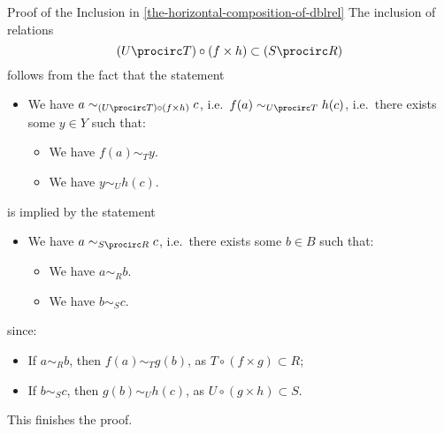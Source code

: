 \begin{Proof}{Proof of the Inclusion in \cref{the-horizontal-composition-of-dblrel}}%
    The inclusion of relations
    \[
        (U\procirc T)\circ(f\times h)%
        \subset%
        (S\procirc R)%
    \]%
    follows from the fact that the statement
    \begin{itemize}
        \item We have $a\sim_{(U\procirc T)\circ(f\times h)}c$, i.e.\ $f(a)\sim_{U\procirc T}h(c)$, i.e.\ there exists some $y\in Y$ such that:
            \begin{itemize}
                \item We have $f(a)\sim_{T}y$.
                \item We have $y\sim_{U}h(c)$.
            \end{itemize}
    \end{itemize}
    is implied by the statement
    \begin{itemize}
        \item We have $a\sim_{S\procirc R}c$, i.e.\ there exists some $b\in B$ such that:
            \begin{itemize}
                \item We have $a\sim_{R}b$.
                \item We have $b\sim_{S}c$.
            \end{itemize}
    \end{itemize}
    since:
    \begin{itemize}
        \item If $a\sim_{R}b$, then $f(a)\sim_{T}g(b)$, as $T\circ(f\times g)\subset R$;
        \item If $b\sim_{S}c$, then $g(b)\sim_{U}h(c)$, as $U\circ(g\times h)\subset S$.
    \end{itemize}
    This finishes the proof.
\end{Proof}
